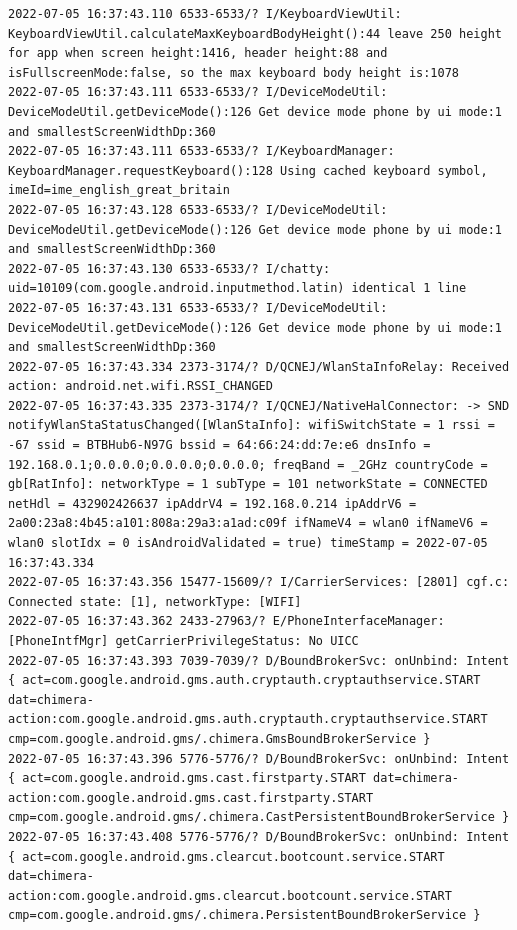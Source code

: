 \documentclass[a4paper,12pt]{book}
\begin{document}
\begin{lstlisting}
2022-07-05 16:37:43.110 6533-6533/? I/KeyboardViewUtil: KeyboardViewUtil.calculateMaxKeyboardBodyHeight():44 leave 250 height for app when screen height:1416, header height:88 and isFullscreenMode:false, so the max keyboard body height is:1078
2022-07-05 16:37:43.111 6533-6533/? I/DeviceModeUtil: DeviceModeUtil.getDeviceMode():126 Get device mode phone by ui mode:1 and smallestScreenWidthDp:360
2022-07-05 16:37:43.111 6533-6533/? I/KeyboardManager: KeyboardManager.requestKeyboard():128 Using cached keyboard symbol, imeId=ime_english_great_britain
2022-07-05 16:37:43.128 6533-6533/? I/DeviceModeUtil: DeviceModeUtil.getDeviceMode():126 Get device mode phone by ui mode:1 and smallestScreenWidthDp:360
2022-07-05 16:37:43.130 6533-6533/? I/chatty: uid=10109(com.google.android.inputmethod.latin) identical 1 line
2022-07-05 16:37:43.131 6533-6533/? I/DeviceModeUtil: DeviceModeUtil.getDeviceMode():126 Get device mode phone by ui mode:1 and smallestScreenWidthDp:360
2022-07-05 16:37:43.334 2373-3174/? D/QCNEJ/WlanStaInfoRelay: Received action: android.net.wifi.RSSI_CHANGED
2022-07-05 16:37:43.335 2373-3174/? I/QCNEJ/NativeHalConnector: -> SND notifyWlanStaStatusChanged([WlanStaInfo]: wifiSwitchState = 1 rssi = -67 ssid = BTBHub6-N97G bssid = 64:66:24:dd:7e:e6 dnsInfo = 192.168.0.1;0.0.0.0;0.0.0.0;0.0.0.0; freqBand = _2GHz countryCode = gb[RatInfo]: networkType = 1 subType = 101 networkState = CONNECTED netHdl = 432902426637 ipAddrV4 = 192.168.0.214 ipAddrV6 = 2a00:23a8:4b45:a101:808a:29a3:a1ad:c09f ifNameV4 = wlan0 ifNameV6 = wlan0 slotIdx = 0 isAndroidValidated = true) timeStamp = 2022-07-05 16:37:43.334
2022-07-05 16:37:43.356 15477-15609/? I/CarrierServices: [2801] cgf.c: Connected state: [1], networkType: [WIFI]
2022-07-05 16:37:43.362 2433-27963/? E/PhoneInterfaceManager: [PhoneIntfMgr] getCarrierPrivilegeStatus: No UICC
2022-07-05 16:37:43.393 7039-7039/? D/BoundBrokerSvc: onUnbind: Intent { act=com.google.android.gms.auth.cryptauth.cryptauthservice.START dat=chimera-action:com.google.android.gms.auth.cryptauth.cryptauthservice.START cmp=com.google.android.gms/.chimera.GmsBoundBrokerService }
2022-07-05 16:37:43.396 5776-5776/? D/BoundBrokerSvc: onUnbind: Intent { act=com.google.android.gms.cast.firstparty.START dat=chimera-action:com.google.android.gms.cast.firstparty.START cmp=com.google.android.gms/.chimera.CastPersistentBoundBrokerService }
2022-07-05 16:37:43.408 5776-5776/? D/BoundBrokerSvc: onUnbind: Intent { act=com.google.android.gms.clearcut.bootcount.service.START dat=chimera-action:com.google.android.gms.clearcut.bootcount.service.START cmp=com.google.android.gms/.chimera.PersistentBoundBrokerService }

\end{lstlisting}
\end{document}
